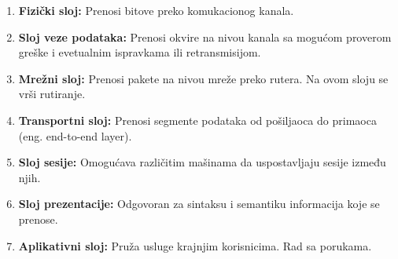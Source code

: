 \documentclass[a4paper]{article}
\begin{document}
            \begin{enumerate}
                \item \textbf{Fizički sloj:} Prenosi bitove preko komukacionog kanala.
                \item \textbf{Sloj veze podataka:} Prenosi okvire na nivou kanala
                      sa mogućom proverom greške i evetualnim ispravkama ili retransmisijom.
                \item \textbf{Mrežni sloj:} Prenosi pakete na nivou mreže preko rutera.
                      Na ovom sloju se vrši rutiranje.
                \item \textbf{Transportni sloj:} Prenosi segmente podataka od pošiljaoca do primaoca 
                      (eng. end-to-end layer).
                \item \textbf{Sloj sesije:} Omogućava različitim mašinama da uspostavljaju sesije između njih.
                \item \textbf{Sloj prezentacije:} Odgovoran za sintaksu i semantiku informacija koje se prenose.
                \item \textbf{Aplikativni sloj:} Pruža usluge krajnjim korisnicima. Rad sa porukama.
            \end{enumerate}
        
\end{document}
